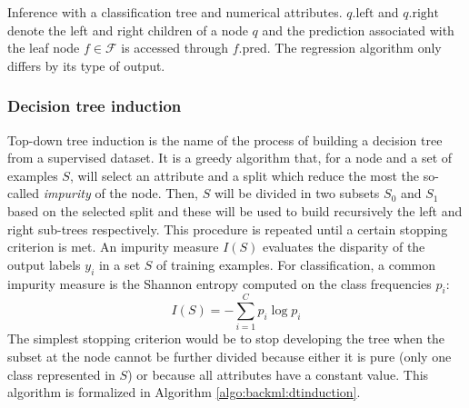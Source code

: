 \begin{algorithm}[t]
  \SetAlgoLined
  \caption{Inference with a classification tree and numerical attributes. $q.\text{left}$ and $q.\text{right}$ denote the left and right children of a node $q$ and the prediction associated with the leaf node $f \in \mathcal{F}$ is accessed through $f.\text{pred}$. The regression algorithm only differs by its type of output.}
  \label{algo:backml:dtinference}
\end{algorithm}

\subsubsection{Decision tree induction}
\label{sssec:backml:dtinduction}

Top-down tree induction is the name of the process of building a decision tree
from a supervised dataset. It is a greedy algorithm that, for a node and a set of
examples $S$, will select an attribute and a split which reduce the most the
so-called \textit{impurity} of the node. Then, $S$ will be divided in two subsets
$S_0$ and $S_1$ based on the selected split and these will be used to build
recursively the left and right sub-trees respectively. This procedure is repeated
until a certain stopping criterion is met. An impurity measure $I(S)$ evaluates
the disparity of the output labels $y_i$ in a set $S$ of training examples. For
classification, a common impurity measure is the Shannon entropy computed on the
class frequencies $p_i$:
\begin{equation}
\label{eqn:backml:shannon_entropy}
I(S) = - \sum_{i=1}^C p_i \log p_i
\end{equation}
The simplest stopping criterion would be to stop developing the tree when the
subset at the node cannot be further divided because either it is pure (\eg only
one class represented in $S$) or because all attributes have a constant value.
This algorithm is formalized in Algorithm \ref{algo:backml:dtinduction}.


